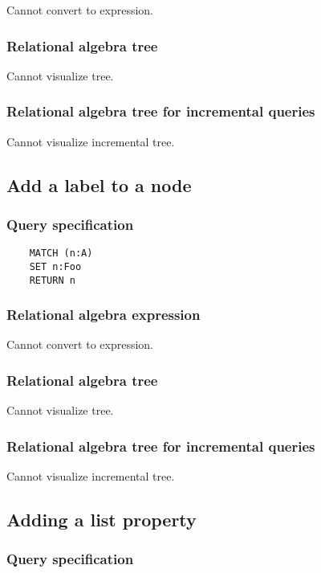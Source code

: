 	Cannot convert to expression.

	\subsubsection*{Relational algebra tree}

	Cannot visualize tree.

	\subsubsection*{Relational algebra tree for incremental queries}

	Cannot visualize incremental tree.
	\subsection{Add a label to a node}

	\subsubsection*{Query specification}

	\begin{lstlisting}
	MATCH (n:A)
	SET n:Foo
	RETURN n
	\end{lstlisting}


	\subsubsection*{Relational algebra expression}

	Cannot convert to expression.

	\subsubsection*{Relational algebra tree}

	Cannot visualize tree.

	\subsubsection*{Relational algebra tree for incremental queries}

	Cannot visualize incremental tree.
	\subsection{Adding a list property}

	\subsubsection*{Query specification}

